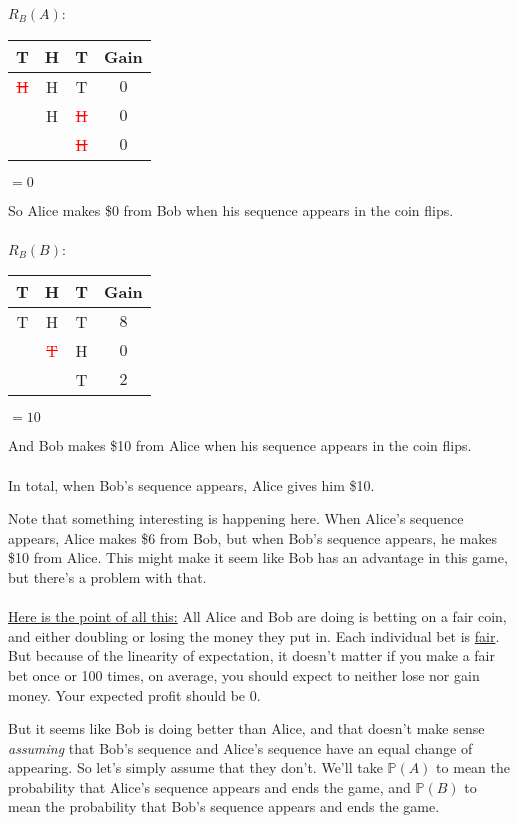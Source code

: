 \documentclass[english,12pt,a4paper,final]{article}
\begin{document}
$R_B(A)$:
\begin{tabular}{|ccc|c|}
	\hline
	T & H & T & Gain \\
	\hline
	
	\textcolor{red}{\sout{H}} & H & T & $0$ \\
	
	& \textcolor{OliveGreen}{H} & \textcolor{red}{\sout{H}} & $0$ \\
	
	&  & \textcolor{red}{\sout{H}} & $0$ \\
	\hline
\end{tabular}
$=0$

So Alice makes \$0 from Bob when his sequence appears in the coin flips.
\\\\

$R_B(B)$:
\begin{tabular}{|ccc|c|}
	\hline
	T & H & T & Gain \\
	\hline
	
	\textcolor{OliveGreen}{T} & \textcolor{OliveGreen}{H} & \textcolor{OliveGreen}{T} & $8$ \\
	
	& \textcolor{red}{\sout{T}} & H & $0$ \\
	
	&  & \textcolor{OliveGreen}{T} & $2$ \\
	\hline
\end{tabular}
$=10$

And Bob makes \$10 from Alice when his sequence appears in the coin flips.
\\\\
In total, when Bob's sequence appears, Alice gives him \$10.

Note that something interesting is happening here. When Alice's sequence appears, Alice makes \$6 from Bob, but when Bob's sequence appears, he makes \$10 from Alice. This might make it seem like Bob has an advantage in this game, but there's a problem with that.
\\\\
\underline{Here is the point of all this:} All Alice and Bob are doing is betting on a fair coin, and either doubling or losing the money they put in. Each individual bet is \underline{fair}. But because of the linearity of expectation, it doesn't matter if you make a fair bet once or 100 times, on average, you should expect to neither lose nor gain money. Your expected profit should be 0.

But it seems like Bob is doing better than Alice, and that doesn't make sense \textit{assuming} that Bob's sequence and Alice's sequence have an equal change of appearing. So let's simply assume that they don't. We'll take $\mathbb{P}(A)$ to mean the probability that Alice's sequence appears and ends the game, and $\mathbb{P}(B)$ to mean the probability that Bob's sequence appears and ends the game.
\end{document}
